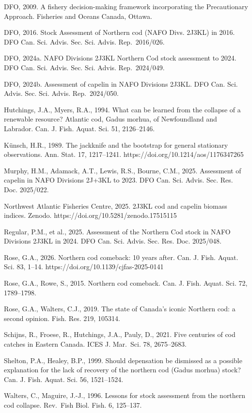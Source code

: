 \documentclass[11pt]{article}
\begin{document}
DFO, 2009. A fishery decision-making framework incorporating the
Precautionary Approach. Fisheries and Oceans Canada, Ottawa.

DFO, 2016. Stock Assessment of Northern cod (NAFO Divs. 2J3KL) in 2016.
DFO Can. Sci. Advis. Sec. Sci. Advis. Rep.~2016/026.

DFO, 2024a. NAFO Divisions 2J3KL Northern Cod stock assessment to 2024.
DFO Can. Sci. Advis. Sec. Sci. Advis. Rep.~2024/049.

DFO, 2024b. Assessment of capelin in NAFO Divisions 2J3KL. DFO Can. Sci.
Advis. Sec. Sci. Advis. Rep.~2024/050.

Hutchings, J.A., Myers, R.A., 1994. What can be learned from the
collapse of a renewable resource? Atlantic cod, Gadus morhua, of
Newfoundland and Labrador. Can. J. Fish. Aquat. Sci. 51, 2126--2146.

K\"unsch, H.R., 1989. The jackknife and the bootstrap for general
stationary observations. Ann. Stat. 17, 1217--1241.
https://doi.org/10.1214/aos/1176347265

Murphy, H.M., Adamack, A.T., Lewis, R.S., Bourne, C.M., 2025. Assessment
of capelin in NAFO Divisions 2J+3KL to 2023. DFO Can. Sci. Advis. Sec.
Res. Doc. 2025/022.

Northwest Atlantic Fisheries Centre, 2025. 2J3KL cod and capelin biomass
indices. Zenodo. https://doi.org/10.5281/zenodo.17515115

Regular, P.M., et al., 2025. Assessment of the Northern Cod stock in
NAFO Divisions 2J3KL in 2024. DFO Can. Sci. Advis. Sec. Res. Doc.
2025/048.

Rose, G.A., 2026. Northern cod comeback: 10 years after. Can. J. Fish.
Aquat. Sci. 83, 1--14. https://doi.org/10.1139/cjfas-2025-0141

Rose, G.A., Rowe, S., 2015. Northern cod comeback. Can. J. Fish. Aquat.
Sci. 72, 1789--1798.

Rose, G.A., Walters, C.J., 2019. The state of Canada's iconic Northern
cod: a second opinion. Fish. Res. 219, 105314.

Schijns, R., Froese, R., Hutchings, J.A., Pauly, D., 2021. Five
centuries of cod catches in Eastern Canada. ICES J. Mar.~Sci. 78,
2675--2683.

Shelton, P.A., Healey, B.P., 1999. Should depensation be dismissed as a
possible explanation for the lack of recovery of the northern cod (Gadus
morhua) stock? Can. J. Fish. Aquat. Sci. 56, 1521--1524.

Walters, C., Maguire, J.-J., 1996. Lessons for stock assessment from the
northern cod collapse. Rev.~Fish Biol. Fish. 6, 125--137.
\end{document}
